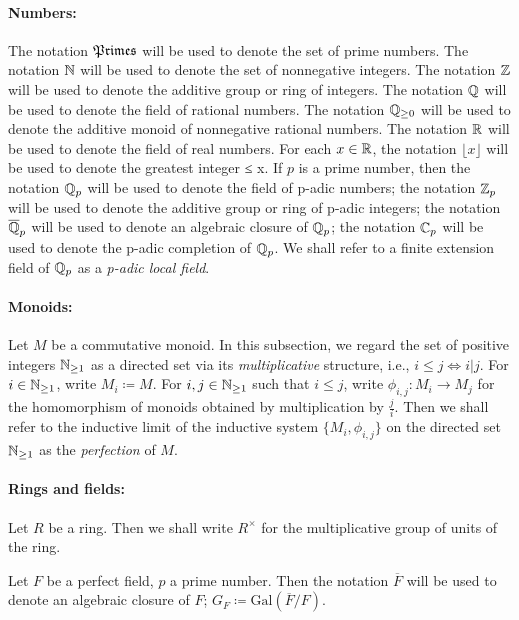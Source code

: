 \paragraph*{Numbers:}

The notation $\mathfrak{Primes}$ will be used to denote the set of prime numbers. The
notation $\mathbb{N}$ will be used to denote the set of nonnegative integers. 
The notation $\mathbb{Z}$ will be used to denote the additive group or ring of integers. The
notation $\mathbb{Q}$ will be used to denote the field of rational numbers. The notation
$\mathbb{Q}_{\ge0}$ will be used to denote the additive monoid of nonnegative rational numbers. The notation $\mathbb{R}$ will be used to denote the field of real numbers. For each $x \in \mathbb{R}$, the notation $\lfloor x \rfloor$ will be used to denote the greatest integer ≤ x. If $p$ is a prime number, then the notation $\mathbb{Q}_p$ will be used to denote the field of p-adic numbers; the notation $\mathbb{Z}_p$ will be used to denote the additive group or ring of p-adic integers; the notation $\overline{\mathbb{Q}}_p$ will be used to denote an algebraic closure of $\mathbb{Q}_p$; the notation $\mathbb{C}_p$ will be used to denote the p-adic completion of $\mathbb{Q}_p$. We shall refer to a finite extension field of $\mathbb{Q}_p$ as a \emph{p-adic local field}.

\paragraph*{Monoids:}

Let $M$ be a commutative monoid. In this subsection, we regard the set
of positive integers $\mathbb{N}_{\ge1}$ as a directed set via its \emph{multiplicative} structure, i.e., $i \leq j \Leftrightarrow i | j$. For $i \in \mathbb{N}_{\ge1}$, write $M_i \coloneqq M$. For $i, j \in \mathbb{N}_{\ge1}$ such that
$i \leq j$, write $\phi_{i,j} : M_i \to M_j$ for the homomorphism of monoids obtained by multiplication by $\frac{j}{i}$. Then we shall refer to the inductive limit of the inductive system $\{M_i, \phi_{i,j}\}$ on the directed set $\mathbb{N}_{\ge1}$ as the \emph{perfection} of $M$.

\paragraph*{Rings and fields:}

Let $R$ be a ring. Then we shall write $R^\times$ for the multiplicative group of units of the ring.

Let $F$ be a perfect field, $p$ a prime number. Then the notation $\overline{F}$ will be used to denote an algebraic closure of $F$; $G_F \coloneqq \text{Gal}(\overline{F} / F)$.

